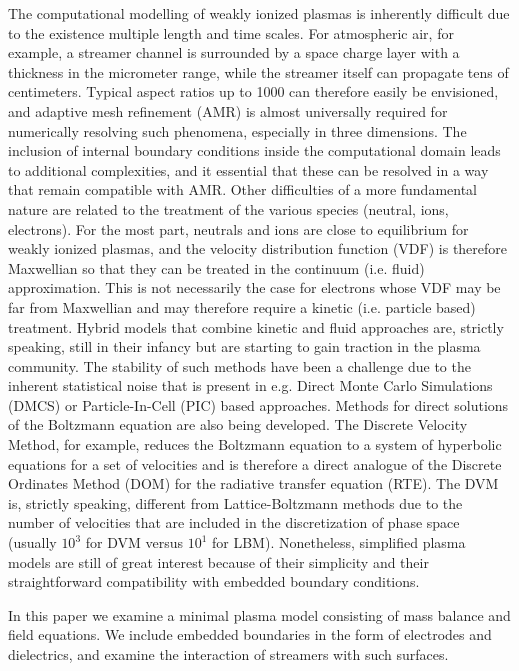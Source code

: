 \documentclass[3p]{elsarticle}
\begin{document}
The computational modelling of weakly ionized plasmas is inherently difficult due to the existence multiple length and time scales. For atmospheric air, for example, a streamer channel is surrounded by a space charge layer with a thickness in the micrometer range, while the streamer itself can propagate tens of centimeters. Typical aspect ratios up to 1000 can therefore easily be envisioned, and adaptive mesh refinement (AMR) is almost universally required for numerically resolving such phenomena, especially in three dimensions. The inclusion of internal boundary conditions inside the computational domain leads to additional complexities, and it essential that these can be resolved in a way that remain compatible with AMR. Other difficulties of a more fundamental nature are related to the treatment of the various species (neutral, ions, electrons). For the most part, neutrals and ions are close to equilibrium for weakly ionized plasmas, and the velocity distribution function (VDF) is therefore Maxwellian so that they can be treated in the continuum (i.e. fluid) approximation. This is not necessarily the case for electrons whose VDF may be far from Maxwellian and may therefore require a kinetic (i.e. particle based) treatment. Hybrid models that combine kinetic and fluid approaches are, strictly speaking, still in their infancy but are starting to gain traction in the plasma community. The stability of such methods have been a challenge due to the inherent statistical noise that is present in e.g. Direct Monte Carlo Simulations (DMCS) or Particle-In-Cell (PIC) based approaches. Methods for direct solutions of the Boltzmann equation are also being developed. The Discrete Velocity Method, for example, reduces the Boltzmann equation to a system of hyperbolic equations for a set of velocities and is therefore a direct analogue of the Discrete Ordinates Method (DOM) for the radiative transfer equation (RTE). The DVM is, strictly speaking, different from Lattice-Boltzmann methods due to the number of velocities that are included in the discretization of phase space (usually $10^3$ for DVM versus $10^1$ for LBM). Nonetheless, simplified plasma models are still of great interest because of their simplicity and their straightforward compatibility with embedded boundary conditions. 

In this paper we examine a minimal plasma model consisting of mass balance and field equations. We include embedded boundaries in the form of electrodes and dielectrics, and examine the interaction of streamers with such surfaces. 
\end{document}
